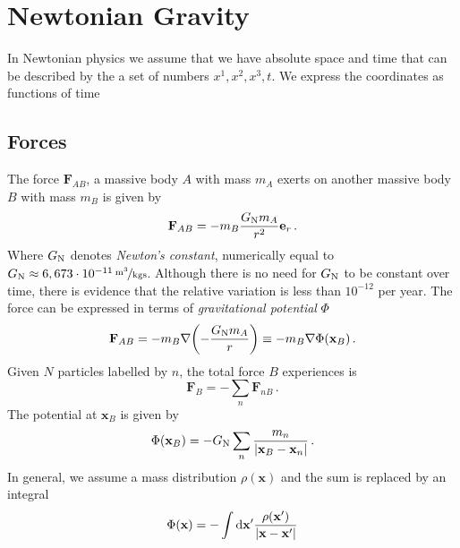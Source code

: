 \documentclass[
    a4paper,                                               %
    oneside,                                               %
    12pt,                                                  %
    headsepline,                                           %
    xcolor=dvipsnames
    ]{scrreprt}
\theoremstyle{definition}
\theoremstyle{remark}
\let\originalleft\left
\let\originalright\right
\renewcommand{\left}{\mathopen{}\mathclose\bgroup\originalleft}
\renewcommand{\right}{\aftergroup\egroup\originalright}
\renewcommand{\vec}{\mathbf}
\begin{document}
    	\setcounter{page}{1}
    	
    	\pagestyle{scrheadings}   
    	\chapter{Newtonian Gravity}
    	In Newtonian physics we assume that we have absolute space and time that can be described by the a set of numbers $x^1,x^2,x^3,t$. We express the coordinates as functions of time
    	\section{Forces}
    	The force $\vec{F}_{AB}$, a massive body $A$ with mass $m_A$ exerts on another massive body $B$ with mass $m_B$ is given by 
    	\begin{equation}
    		\vec{F}_{AB}=-m_B\frac{G\textsubscript{N}m_A}{r^2}\vec{e}_r\, .
    	\end{equation}
    	Where $G\textsubscript{N}$ denotes \emph{Newton's constant}, numerically equal to $G\textsubscript{N}\approx \unitfrac[6,673\cdot 10^{-11}]{m^3}{kgs}$. Although there is no need for $G\textsubscript{N}$ to be constant over time, there is evidence that the relative variation is less than $10^{-12}$ per year. The force can be expressed in terms of \emph{gravitational potential} $\Phi$
    	\begin{equation}
    	\vec{F}_{AB}=-m_B\nabla\left(-\frac{G\textsubscript{N}m_A}{r}\right)\equiv -m_B\nabla\Phi(\vec{x}_B)\, .
    	\end{equation}
    	Given $N$ particles labelled by $n$, the total force $B$ experiences is 
    	\begin{equation}
    		\vec{F}_{B}=-\sum_n \vec{F}_{nB}\, .
    	\end{equation} 
    	The potential at $\vec{x}_B$ is given by 
	 	\begin{equation}
 	    \Phi(\vec{x}_B)=-G\textsubscript{N}\sum_n\frac{m_n}{|\vec{x}_B-\vec{x}_n|}\, .
 	    \end{equation} 
 	    In general, we assume a mass distribution $\rho(\vec{x})$ and the sum is replaced by an integral
 	    \begin{equation}
 	    	\Phi(\vec{x})=-\int\dif{\vec{x}^{\prime}}\frac{\rho(\vec{x}^{\prime})}{|\vec{x}-\vec{x}^{\prime}|}
 	    \end{equation}
\end{document}
